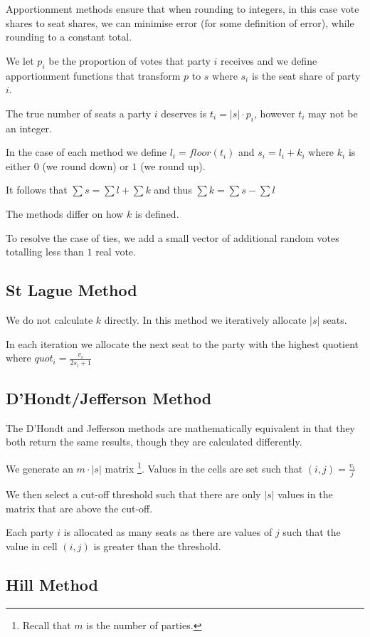 \documentclass{article}
\begin{document}
Apportionment methods ensure that when rounding to integers, in this case vote shares to seat shares, we can minimise error (for some definition of error), while rounding to a constant total.

We let $p_i$ be the proportion of votes that party $i$ receives and we define apportionment functions that transform $p$ to $s$ where $s_i$ is the seat share of party $i$.

The true number of seats a party $i$ deserves is $t_i = |s| \cdot p_i$, however $t_i$ may not be an integer.

In the case of each method we define $l_i = floor(t_i)$ and $s_i = l_i + k_i$ where $k_i$ is either $0$ (we round down) or $1$ (we round up).

It follows that $\sum{s}=\sum{l}+\sum{k}$ and thus $\sum{k}=\sum{s}-\sum{l}$

The methods differ on how $k$ is defined.

To resolve the case of ties, we add a small vector of additional random votes totalling less than $1$ real vote.
\subsection{St Lague Method}
We do not calculate $k$ directly. In this method we iteratively allocate $|s|$ seats.

In each iteration we allocate the next seat to the party with the highest quotient where $quot_i=\frac{v_i}{2s_i+1}$
\subsection{D'Hondt/Jefferson Method}
The D'Hondt and Jefferson methods are mathematically equivalent in that they both return the same results, though they are calculated differently.

We generate an $m \cdot |s|$ matrix \footnote{Recall that $m$ is the number of parties.}. Values in the cells are set such that $(i,j)=\frac{v_i}{j}$

We then select a cut-off threshold such that there are only $|s|$ values in the matrix that are above the cut-off.

Each party $i$ is allocated as many seats as there are values of $j$ such that the value in cell $(i,j)$ is greater than the threshold.
\subsection{Hill Method}
\end{document}
